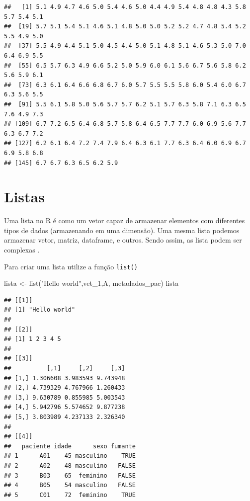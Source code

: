 \documentclass[
]{book}
\newenvironment{Shaded}{\begin{snugshade}}{\end{snugshade}}
\newcommand{\CommentTok}[1]{\textcolor[rgb]{0.56,0.35,0.01}{\textit{#1}}}
\newcommand{\FunctionTok}[1]{\textcolor[rgb]{0.00,0.00,0.00}{#1}}
\newcommand{\NormalTok}[1]{#1}
\newcommand{\OtherTok}[1]{\textcolor[rgb]{0.56,0.35,0.01}{#1}}
\newcommand{\SpecialCharTok}[1]{\textcolor[rgb]{0.00,0.00,0.00}{#1}}
\newcommand{\StringTok}[1]{\textcolor[rgb]{0.31,0.60,0.02}{#1}}
\begin{document}
\begin{Shaded}
\end{Shaded}

\begin{verbatim}
##   [1] 5.1 4.9 4.7 4.6 5.0 5.4 4.6 5.0 4.4 4.9 5.4 4.8 4.8 4.3 5.8 5.7 5.4 5.1
##  [19] 5.7 5.1 5.4 5.1 4.6 5.1 4.8 5.0 5.0 5.2 5.2 4.7 4.8 5.4 5.2 5.5 4.9 5.0
##  [37] 5.5 4.9 4.4 5.1 5.0 4.5 4.4 5.0 5.1 4.8 5.1 4.6 5.3 5.0 7.0 6.4 6.9 5.5
##  [55] 6.5 5.7 6.3 4.9 6.6 5.2 5.0 5.9 6.0 6.1 5.6 6.7 5.6 5.8 6.2 5.6 5.9 6.1
##  [73] 6.3 6.1 6.4 6.6 6.8 6.7 6.0 5.7 5.5 5.5 5.8 6.0 5.4 6.0 6.7 6.3 5.6 5.5
##  [91] 5.5 6.1 5.8 5.0 5.6 5.7 5.7 6.2 5.1 5.7 6.3 5.8 7.1 6.3 6.5 7.6 4.9 7.3
## [109] 6.7 7.2 6.5 6.4 6.8 5.7 5.8 6.4 6.5 7.7 7.7 6.0 6.9 5.6 7.7 6.3 6.7 7.2
## [127] 6.2 6.1 6.4 7.2 7.4 7.9 6.4 6.3 6.1 7.7 6.3 6.4 6.0 6.9 6.7 6.9 5.8 6.8
## [145] 6.7 6.7 6.3 6.5 6.2 5.9
\end{verbatim}

\hypertarget{listas}{%
\section{Listas}\label{listas}}

Uma lista no R é como um vetor capaz de armazenar elementos com diferentes tipos de dados (armazenando em uma dimensão). Uma mesma lista podemos armazenar vetor, matriz, dataframe, e outros. Sendo assim, as lista podem ser complexas .

Para criar uma lista utilize a função \texttt{list()}

\begin{Shaded}
\begin{Highlighting}[]
\NormalTok{lista }\OtherTok{\textless{}{-}} \FunctionTok{list}\NormalTok{(}\StringTok{"Hello world"}\NormalTok{,vet\_1,A, metadados\_pac) }
\NormalTok{lista}
\end{Highlighting}
\end{Shaded}

\begin{verbatim}
## [[1]]
## [1] "Hello world"
## 
## [[2]]
## [1] 1 2 3 4 5
## 
## [[3]]
##          [,1]     [,2]     [,3]
## [1,] 1.306608 3.983593 9.743948
## [2,] 4.739329 4.767966 1.260433
## [3,] 9.630789 0.855985 5.003543
## [4,] 5.942796 5.574652 9.877238
## [5,] 3.803989 4.237133 2.326340
## 
## [[4]]
##   paciente idade      sexo fumante
## 1      A01    45 masculino    TRUE
## 2      A02    48 masculino   FALSE
## 3      B03    65  feminino   FALSE
## 4      B05    54 masculino   FALSE
## 5      C01    72  feminino    TRUE
\end{verbatim}
\end{document}
